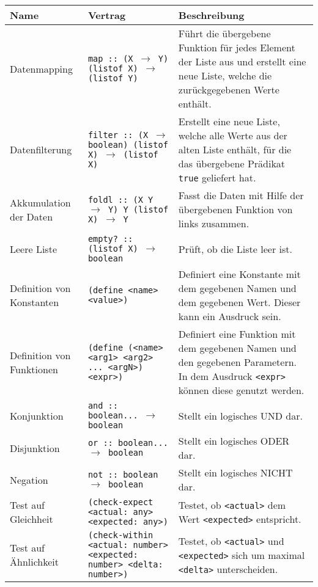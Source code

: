 \documentclass[a4paper, 11pt, accentcolor = tud3b]{tudreport}
\begin{document}
            \begin{sidewaystable}
                \centering
                \begin{tabular}{p{5cm} | p{7cm} | p{9cm}}
                    Name & Vertrag & Beschreibung \\
                    \hline
                    Datenmapping & \texttt{map :: (X $ \rightarrow $ Y) (listof X) $ \rightarrow $ (listof Y)} & Führt die übergebene Funktion für jedes Element der Liste aus und erstellt eine neue Liste, welche die zurückgegebenen Werte enthält. \\
                    Datenfilterung & \texttt{filter :: (X $ \rightarrow $ boolean) (listof X) $ \rightarrow $ (listof X)} & Erstellt eine neue Liste, welche alle Werte aus der alten Liste enthält, für die das übergebene Prädikat \texttt{true} geliefert hat. \\
                    Akkumulation der Daten & \texttt{foldl :: (X Y $ \rightarrow $ Y) Y (listof X) $ \rightarrow $ Y} & Fasst die Daten mit Hilfe der übergebenen Funktion von links zusammen. \\
                    Leere Liste & \texttt{empty? :: (listof X) $ \rightarrow $ boolean} & Prüft, ob die Liste leer ist. \\
                    \hline
                    Definition von Konstanten & \texttt{(define <name> <value>)} & Definiert eine Konstante mit dem gegebenen Namen und dem gegebenen Wert. Dieser kann ein Ausdruck sein. \\
                    Definition von Funktionen & \texttt{(define (<name> <arg1> <arg2> ... <argN>) <expr>)} & Definiert eine Funktion mit dem gegebenen Namen und den gegebenen Parametern. In dem Ausdruck \texttt{<expr>} können diese genutzt werden. \\
                    \hline
                    Konjunktion & \texttt{and :: boolean... $ \rightarrow $ boolean} & Stellt ein logisches UND dar. \\
                    Disjunktion & \texttt{or :: boolean... $ \rightarrow $ boolean} & Stellt ein logisches ODER dar. \\
                    Negation & \texttt{not :: boolean $ \rightarrow $ boolean} & Stellt ein logisches NICHT dar. \\
                    \hline
                    Test auf Gleichheit & \texttt{(check-expect <actual: any> <expected: any>)} & Testet, ob \texttt{<actual>} dem Wert \texttt{<expected>} entspricht. \\
                    Test auf Ähnlichkeit & \texttt{(check-within <actual: number> <expected: number> <delta: number>)} & Testet, ob \texttt{<actual>} und \texttt{<expected>} sich um maximal \texttt{<delta>} unterscheiden. \\

\end{tabular}
\end{sidewaystable}
\end{document}
